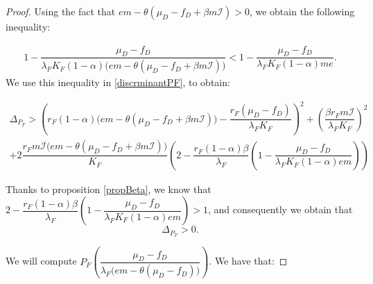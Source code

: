 \documentclass{article}
\newcommand{\lfw}{\lambda_{F}}
\newcommand{\lfw}{\lambda_{F}}
\newcommand{\cI}{\mathcal{I}}
\begin{document}
\begin{proof}
Using the fact that $e m - \theta(\mu_D - f_D + \beta m \cI) > 0$, we obtain the following inequality:

\begin{align*}
1 - \dfrac{\mu_D - f_D}{\lfw K_F(1-\alpha) \Big(e m - \theta (\mu_D - f_D + \beta m \cI)\Big)} < 1 - \dfrac{\mu_D - f_D}{\lfw K_F(1-\alpha) me }.
\end{align*}
We use this inequality in \eqref{discrminantPF}, to obtain:

\begin{multline*}
\Delta_{P_F} > \left(r_F (1-\alpha)   \Big(em - \theta(\mu_D-f_D + \beta m \cI)  \Big) - \dfrac{r_F(\mu_D-f_D) }{\lfw K_F} \right)^2 + \left( \dfrac{\beta r_F m \cI}{\lfw K_F}\right)^2 \\  +  2 \dfrac{r_F m \cI \Big(e m - \theta (\mu_D - f_D + \beta m \cI)\Big)}{K_F} \left(2 - \dfrac{r_F(1-\alpha)\beta }{\lfw} \left(1 - \dfrac{\mu_D - f_D}{\lfw K_F(1-\alpha) e m }\right) \right)
\end{multline*}

Thanks to proposition \ref{propBeta}, we know that $2 - \dfrac{r_F(1-\alpha)\beta }{\lfw} \left(1 - \dfrac{\mu_D - f_D}{\lfw K_F(1-\alpha) e m }\right) > 1$, and consequently we obtain that
$$
\Delta_{P_F} > 0.
$$


We will compute $P_F\left(\dfrac{\mu_D - f_D}{\lfw \Big(em - \theta (\mu_D - f_D) \Big)} \right)$. We have that:


\end{proof}
\end{document}
